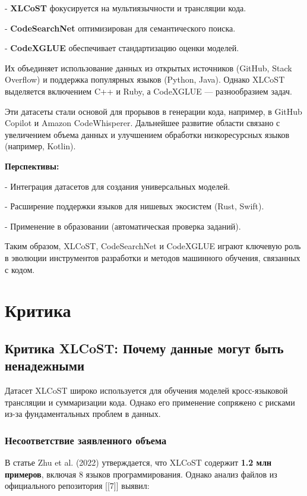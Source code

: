 \documentclass[14pt]{article}
\theoremstyle{definition}
\begin{document}
    
- \textbf{XLCoST} фокусируется на мультиязычности и трансляции кода.
    
- \textbf{CodeSearchNet} оптимизирован для семантического поиска.
    
- \textbf{CodeXGLUE} обеспечивает стандартизацию оценки моделей.


Их объединяет использование данных из открытых источников (GitHub, Stack Overflow) и поддержка популярных языков (Python, Java). Однако XLCoST выделяется включением C++ и Ruby, а CodeXGLUE — разнообразием задач.

Эти датасеты стали основой для прорывов в генерации кода, например, в GitHub Copilot и Amazon CodeWhisperer. Дальнейшее развитие области связано с увеличением объема данных и улучшением обработки низкоресурсных языков (например, Kotlin).

\textbf{Перспективы:}

    
- Интеграция датасетов для создания универсальных моделей.
    
- Расширение поддержки языков для нишевых экосистем (Rust, Swift).
    
- Применение в образовании (автоматическая проверка заданий).


Таким образом, XLCoST, CodeSearchNet и CodeXGLUE играют ключевую роль в эволюции инструментов разработки и методов машинного обучения, связанных с кодом.




\newpage


\newpage
\section{Критика}
\subsection{Критика XLCoST: Почему данные могут быть ненадежными}

Датасет XLCoST широко используется для обучения моделей кросс-языковой трансляции и суммаризации кода. Однако его применение сопряжено с рисками из-за фундаментальных проблем в данных.

\subsubsection{Несоответствие заявленного объема}

В статье Zhu et al. (2022) утверждается, что XLCoST содержит \textbf{1.2 млн примеров}, включая 8 языков программирования. Однако анализ файлов из официального репозитория [[7]] выявил:
\end{document}
